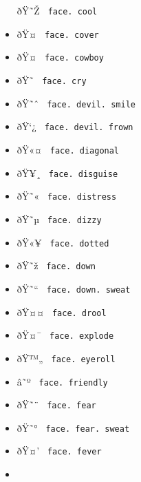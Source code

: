 \begin{itemize}
  \label{symbol-face.cool}{{ ðŸ˜Ž }
  \texttt{\ face.\ cool\ }}
\item
  \label{symbol-face.cover}{{ ðŸ¤­ }
  \texttt{\ face.\ cover\ }}
\item
  \label{symbol-face.cowboy}{{ ðŸ¤ }
  \texttt{\ face.\ cowboy\ }}
\item
  \label{symbol-face.cry}{{ ðŸ˜­ }
  \texttt{\ face.\ cry\ }}
\item
  \label{symbol-face.devil.smile}{{ ðŸ˜ˆ }
  \texttt{\ face.\ devil.\ smile\ }}
\item
  \label{symbol-face.devil.frown}{{ ðŸ`¿ }
  \texttt{\ face.\ devil.\ frown\ }}
\item
  \label{symbol-face.diagonal}{{ ðŸ«¤ }
  \texttt{\ face.\ diagonal\ }}
\item
  \label{symbol-face.disguise}{{ ðŸ¥¸ }
  \texttt{\ face.\ disguise\ }}
\item
  \label{symbol-face.distress}{{ ðŸ˜« }
  \texttt{\ face.\ distress\ }}
\item
  \label{symbol-face.dizzy}{{ ðŸ˜µ }
  \texttt{\ face.\ dizzy\ }}
\item
  \label{symbol-face.dotted}{{ ðŸ«¥ }
  \texttt{\ face.\ dotted\ }}
\item
  \label{symbol-face.down}{{ ðŸ˜ž }
  \texttt{\ face.\ down\ }}
\item
  \label{symbol-face.down.sweat}{{ ðŸ˜`` }
  \texttt{\ face.\ down.\ sweat\ }}
\item
  \label{symbol-face.drool}{{ ðŸ¤¤ }
  \texttt{\ face.\ drool\ }}
\item
  \label{symbol-face.explode}{{ ðŸ¤¯ }
  \texttt{\ face.\ explode\ }}
\item
  \label{symbol-face.eyeroll}{{ ðŸ™„ }
  \texttt{\ face.\ eyeroll\ }}
\item
  \label{symbol-face.friendly}{{ â˜º }
  \texttt{\ face.\ friendly\ }}
\item
  \label{symbol-face.fear}{{ ðŸ˜¨ }
  \texttt{\ face.\ fear\ }}
\item
  \label{symbol-face.fear.sweat}{{ ðŸ˜° }
  \texttt{\ face.\ fear.\ sweat\ }}
\item
  \label{symbol-face.fever}{{ ðŸ¤' }
  \texttt{\ face.\ fever\ }}
\item

\end{itemize}
